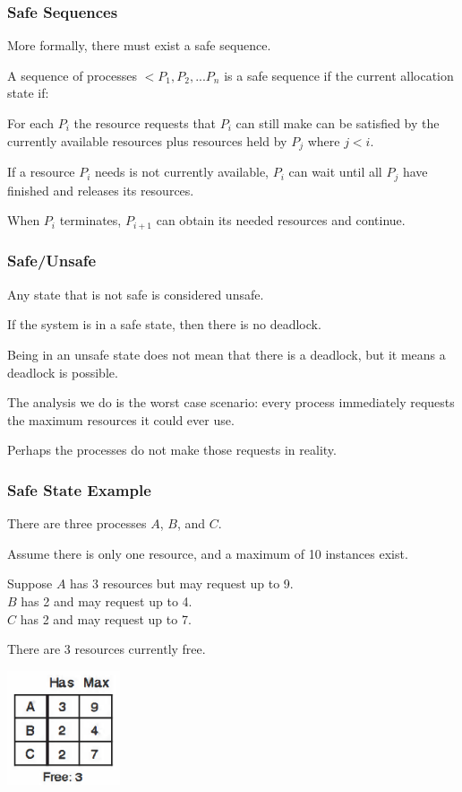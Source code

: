 \begin{frame}
\frametitle{Safe Sequences}

More formally, there must exist a \alert{safe sequence}.

A sequence of processes $<P_{1}, P_{2}, ... P_{n}$ is a safe sequence if the current allocation state if:

For each $P_{i}$ the resource requests that $P_{i}$ can still make can be satisfied by the currently available resources plus resources held by $P_{j}$ where $j < i$. 

If a resource $P_{i}$ needs is not currently available, $P_{i}$ can wait until all $P_{j}$ have finished and releases its resources. 

When $P_{i}$ terminates, $P_{i+1}$ can obtain its needed resources and continue.

\end{frame}

\begin{frame}
\frametitle{Safe/Unsafe}

Any state that is not safe is considered \alert{unsafe}. 

If the system is in a safe state, then there is no deadlock. 

Being in an unsafe state does not mean that there is a deadlock, but it means a deadlock is possible. 

The analysis we do is the worst case scenario: every process immediately requests the maximum resources it could ever use. 

Perhaps the processes do not make those requests in reality.

\end{frame}

\begin{frame}
\frametitle{Safe State Example}

There are three processes $A$, $B$, and $C$. 

Assume there is only one resource, and a maximum of 10 instances exist. 

Suppose $A$ has 3 resources but may request up to 9.\\
$B$ has 2 and may request up to 4.\\
$C$ has 2 and may request up to 7. 

There are 3 resources currently free.

\begin{center}
\includegraphics[width=0.25\textwidth]{images/safe-state-initial.png}
\end{center}

\end{frame}

